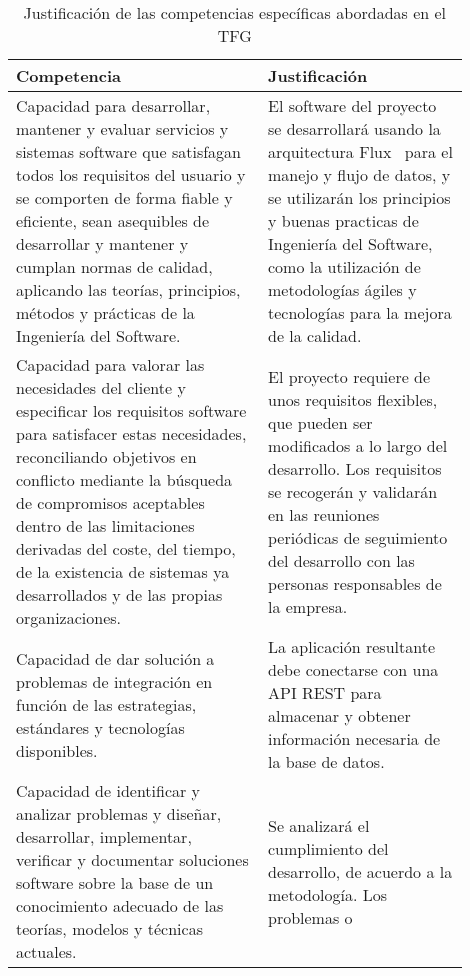 \documentclass{pre-tfg}
\begin{document}
    \begin{table}[hp]
        \centering
        \caption{Justificación de las competencias específicas abordadas en el TFG}
        \label{tab:competencias}

        \begin{tabular}{p{0.5\linewidth}p{0.4\linewidth}}
            \textbf{Competencia} & \textbf{Justificación} \\
            \hline
            Capacidad para desarrollar, mantener y evaluar servicios y sistemas software que satisfagan
            todos los requisitos del usuario y se comporten de forma fiable y eficiente, sean asequibles
            de desarrollar y mantener y cumplan normas de calidad, aplicando las teorías, principios,
            métodos y prácticas de la Ingeniería del Software.
            & El software del proyecto se desarrollará usando la arquitectura Flux~\cite{FLUX} para el manejo
             y flujo de datos, y se utilizarán los principios  y buenas practicas de Ingeniería del Software, 
             como la utilización de metodologías ágiles y tecnologías para la mejora de la calidad.\\
            Capacidad para valorar las necesidades del cliente y especificar los requisitos software para
            satisfacer estas necesidades, reconciliando objetivos en conflicto mediante la búsqueda de
            compromisos aceptables dentro de las limitaciones derivadas del coste, del tiempo, de la existencia
            de sistemas ya desarrollados y de las propias organizaciones.
            & El proyecto requiere de unos requisitos flexibles, que pueden ser modificados a lo largo del
            desarrollo. Los requisitos se recogerán y validarán en las reuniones periódicas de seguimiento
            del desarrollo con las personas responsables de la empresa.\\
            Capacidad de dar solución a problemas de integración en función de las estrategias, estándares
            y tecnologías disponibles.
            & La aplicación resultante debe conectarse con una API REST para almacenar y obtener información
            necesaria de la base de datos.\\
            Capacidad de identificar y analizar problemas y diseñar, desarrollar, implementar, verificar y
            documentar soluciones software sobre la base de un conocimiento adecuado de las teorías, modelos
            y técnicas actuales.
            & Se analizará el cumplimiento del desarrollo, de acuerdo a la metodología. Los problemas o

\end{tabular}
\end{table}
\end{document}
